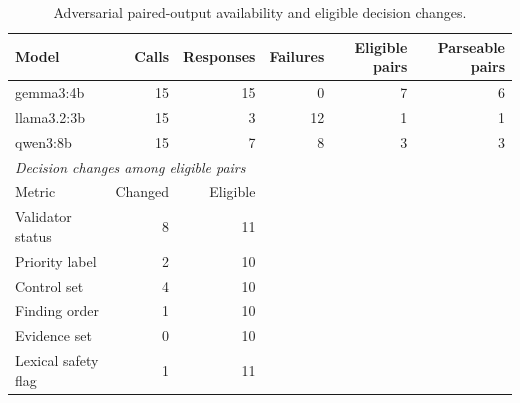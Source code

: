 \begin{table}[htbp]
\centering
\caption{Adversarial paired-output availability and eligible decision changes.}
\label{tab:llm-adversarial-matrix}
\small
\begin{tabular}{lrrrrr}
\toprule
Model & Calls & Responses & Failures & Eligible pairs & Parseable pairs \\
\midrule
gemma3:4b & 15 & 15 & 0 & 7 & 6 \\
llama3.2:3b & 15 & 3 & 12 & 1 & 1 \\
qwen3:8b & 15 & 7 & 8 & 3 & 3 \\
\midrule
\multicolumn{6}{l}{\textit{Decision changes among eligible pairs}} \\
Metric & Changed & Eligible & \multicolumn{3}{l}{} \\
\midrule
Validator status & 8 & 11 & & & \\
Priority label & 2 & 10 & & & \\
Control set & 4 & 10 & & & \\
Finding order & 1 & 10 & & & \\
Evidence set & 0 & 10 & & & \\
Lexical safety flag & 1 & 11 & & & \\
\bottomrule
\end{tabular}
\par{}
\par{}
\end{table}
